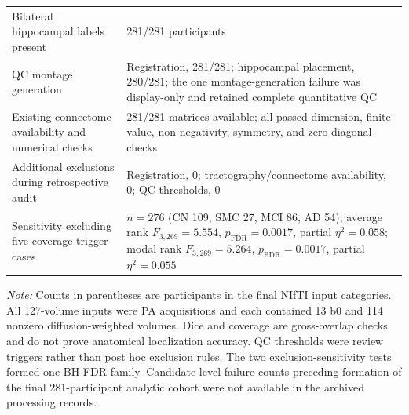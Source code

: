 \documentclass{article}
\begin{document}
\begin{table}[!htbp]
\begin{tabularx}{\textwidth}{@{}p{}X@{}}
Bilateral hippocampal labels present & 281/281 participants\\
QC montage generation & Registration, 281/281; hippocampal placement, 280/281; the one montage-generation failure was display-only and retained complete quantitative QC\\
Existing connectome availability and numerical checks & 281/281 matrices available; all passed dimension, finite-value, non-negativity, symmetry, and zero-diagonal checks\\
Additional exclusions during retrospective audit & Registration, 0; tractography/connectome availability, 0; QC thresholds, 0\\
Sensitivity excluding five coverage-trigger cases & $n=276$ (CN 109, SMC 27, MCI 86, AD 54); average rank $F_{3,269}=5.554$, $p_{\mathrm{FDR}}=0.0017$, partial $\eta^2=0.058$; modal rank $F_{3,269}=5.264$, $p_{\mathrm{FDR}}=0.0017$, partial $\eta^2=0.055$\\
\bottomrule
\end{tabularx}
\par\vspace{1mm}
\footnotesize{\textit{Note:} Counts in parentheses are participants in the final NIfTI input categories. All 127-volume inputs were PA acquisitions and each contained 13 b0 and 114 nonzero diffusion-weighted volumes. Dice and coverage are gross-overlap checks and do not prove anatomical localization accuracy. QC thresholds were review triggers rather than post hoc exclusion rules. The two exclusion-sensitivity tests formed one BH-FDR family. Candidate-level failure counts preceding formation of the final 281-participant analytic cohort were not available in the archived processing records.}
\end{table}
\end{document}

